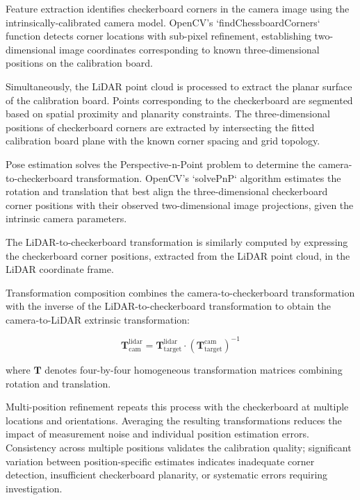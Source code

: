 \documentclass{erauthesis}
\begin{document}
Feature extraction identifies checkerboard corners in the camera image using the intrinsically-calibrated camera model.
OpenCV's `findChessboardCorners` function detects corner locations with sub-pixel refinement, establishing two-dimensional image coordinates corresponding to known three-dimensional positions on the calibration board.

Simultaneously, the LiDAR point cloud is processed to extract the planar surface of the calibration board.
Points corresponding to the checkerboard are segmented based on spatial proximity and planarity constraints.
The three-dimensional positions of checkerboard corners are extracted by intersecting the fitted calibration board plane with the known corner spacing and grid topology.

Pose estimation solves the Perspective-n-Point problem to determine the camera-to-checkerboard transformation.
OpenCV's `solvePnP` algorithm estimates the rotation and translation that best align the three-dimensional checkerboard corner positions with their observed two-dimensional image projections, given the intrinsic camera parameters.

The LiDAR-to-checkerboard transformation is similarly computed by expressing the checkerboard corner positions, extracted from the LiDAR point cloud, in the LiDAR coordinate frame.

Transformation composition combines the camera-to-checkerboard transformation with the inverse of the LiDAR-to-checkerboard transformation to obtain the camera-to-LiDAR extrinsic transformation:

\begin{equation}
    \mathbf{T}_{\text{cam}}^{\text{lidar}} = \mathbf{T}_{\text{target}}^{\text{lidar}} \cdot \left(\mathbf{T}_{\text{target}}^{\text{cam}}\right)^{-1}    
\end{equation}

where $\mathbf{T}$ denotes four-by-four homogeneous transformation matrices combining rotation and translation.

Multi-position refinement repeats this process with the checkerboard at multiple locations and orientations.
Averaging the resulting transformations reduces the impact of measurement noise and individual position estimation errors.
Consistency across multiple positions validates the calibration quality; significant variation between position-specific estimates indicates inadequate corner detection, insufficient checkerboard planarity, or systematic errors requiring investigation.
\end{document}
